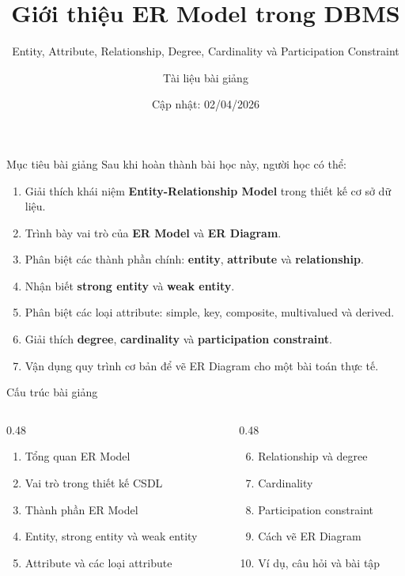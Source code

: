 \documentclass[aspectratio=169,11pt]{beamer}
\title[ER Model trong DBMS]{Giới thiệu ER Model trong DBMS}
\subtitle{Entity, Attribute, Relationship, Degree, Cardinality và Participation Constraint}
\author{Tài liệu bài giảng}
\institute{Môn học: Cơ sở dữ liệu}
\date{Cập nhật: 02/04/2026}
\newcommand{\keyword}[1]{\textcolor{accent}{\textbf{#1}}}
\newcommand{\kw}[1]{\keyword{#1}}
\newcommand{\smallitem}{\setlength{\itemsep}{2pt}\setlength{\parskip}{0pt}}
\begin{document}
\begin{frame}
  \titlepage
\end{frame}

\begin{frame}{Mục tiêu bài giảng}
\small
Sau khi hoàn thành bài học này, người học có thể:
\begin{enumerate}
\smallitem
  \item Giải thích khái niệm \kw{Entity-Relationship Model} trong thiết kế cơ sở dữ liệu.
  \item Trình bày vai trò của \kw{ER Model} và \kw{ER Diagram}.
  \item Phân biệt các thành phần chính: \kw{entity}, \kw{attribute} và \kw{relationship}.
  \item Nhận biết \kw{strong entity} và \kw{weak entity}.
  \item Phân biệt các loại attribute: simple, key, composite, multivalued và derived.
  \item Giải thích \kw{degree}, \kw{cardinality} và \kw{participation constraint}.
  \item Vận dụng quy trình cơ bản để vẽ ER Diagram cho một bài toán thực tế.
\end{enumerate}
\end{frame}

\begin{frame}{Cấu trúc bài giảng}
\small
\begin{columns}[T]
\begin{column}{0.48\textwidth}
\begin{enumerate}
\smallitem
  \item Tổng quan ER Model
  \item Vai trò trong thiết kế CSDL
  \item Thành phần ER Model
  \item Entity, strong entity và weak entity
  \item Attribute và các loại attribute
\end{enumerate}
\end{column}
\begin{column}{0.48\textwidth}
\begin{enumerate}
\setcounter{enumi}{5}
\smallitem
  \item Relationship và degree
  \item Cardinality
  \item Participation constraint
  \item Cách vẽ ER Diagram
  \item Ví dụ, câu hỏi và bài tập
\end{enumerate}
\end{column}
\end{columns}
\end{frame}
\end{document}
